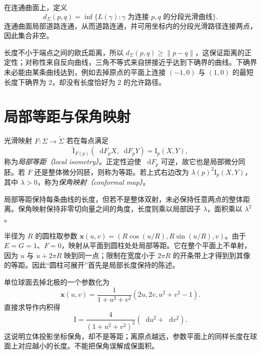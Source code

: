 \documentclass[UTF8,12pt,a4paper,fontset=fandol]{ctexbook}
\newcommand{\dd}{\mathop{}\!\mathrm d}
\newcommand{\norm}[1]{\lVert #1\rVert}
\begin{document}
\begin{definition}[内蕴距离]
在连通曲面上，定义
\[
 d_\Sigma(p,q)=\inf\{L(\gamma):\gamma\text{ 为连接 }p,q\text{ 的分段光滑曲线}\}.
\]
连通曲面局部道路连通，从而道路连通，并可用坐标内的分段光滑路径连接两点，因此集合非空。
\end{definition}
长度不小于端点之间的欧氏距离，所以 $d_\Sigma(p,q)\ge\norm{p-q}$，这保证距离的正定性；对称性来自反向曲线，三角不等式来自拼接近乎达到下确界的曲线。下确界未必能由某条曲线达到，例如去掉原点的平面上连接 $(-1,0)$ 与 $(1,0)$ 的最短长度下确界为 $2$，却没有长度恰好为 $2$ 的允许路径。

\section{局部等距与保角映射}
\begin{definition}[等距与保角]
光滑映射 $F:\Sigma\to\widetilde\Sigma$ 若在每点满足
\[
 \widetilde{\mathrm I}_{F(p)}(\dd F_pX,\dd F_pY)=\mathrm I_p(X,Y),
\]
称为\emph{局部等距（local isometry）}。正定性迫使 $\dd F_p$ 可逆，故它也是局部微分同胚。若 $F$ 还是整体微分同胚，则称为等距。若上式右边改为 $\lambda(p)^2\mathrm I_p(X,Y)$，其中 $\lambda>0$，称为\emph{保角映射（conformal map）}。
\end{definition}
局部等距保持每条曲线的长度，但若不是整体双射，未必保持任意两点的整体距离。保角映射保持非零切向量之间的角度，长度则乘以局部因子 $\lambda$，面积乘以 $\lambda^2$。

\begin{example}[圆柱展开]\label{exam:dg-cylinder-isometry}
半径为 $R$ 的圆柱取参数 $\mathbf x(u,v)=(R\cos(u/R),R\sin(u/R),v)$。由于 $E=G=1$、$F=0$，映射从平面到圆柱处处局部等距。它在整个平面上不单射，因为 $u$ 与 $u+2\pi R$ 映到同一点；限制在宽度小于 $2\pi R$ 的开条带上才得到到其像的等距。因此“圆柱可展开”首先是局部长度保持的陈述。
\end{example}

\begin{example}[球面的立体投影坐标]\label{exam:dg-stereographic}
单位球面去掉北极的一个参数化为
\[
 \mathbf x(u,v)=\frac1{1+u^2+v^2}(2u,2v,u^2+v^2-1).
\]
直接求导作内积得
\begin{equation}
 \mathrm I=\frac4{(1+u^2+v^2)^2}(\dd u^2+\dd v^2).
 \label{eq:dg-stereo-metric}
\end{equation}
这说明立体投影坐标保角，却不是等距；离原点越远，参数平面上的同样长度在球面上对应越小的长度。不能把保角误解成保面积。
\end{example}
\end{document}
